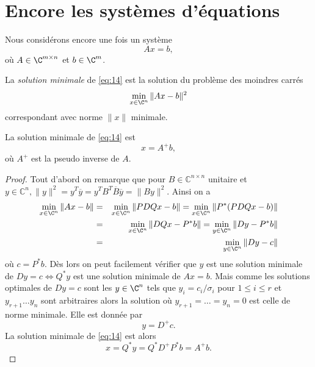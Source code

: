 \section{Encore les systèmes d'équations }
\label{sec:encore-les-systemes}
Nous considérons encore une fois un système 
\begin{equation}
  \label{eq:14}
  Ax = b, 
\end{equation}
où $A \in \C^{m \times n}$ et $b \in \C^m$. 

\begin{definition}
  \label{def:25}
  La \emph{solution minimale} de \eqref{eq:14} est 
  la solution du problème des moindres carrés
  \begin{displaymath}
    \min_{x \in \C^n} \|Ax - b\|^2 
  \end{displaymath}
    correspondant avec norme $\|x\|$ minimale.
\end{definition}



\begin{theorem}
  \label{thr:24}
  La solution minimale de \eqref{eq:14} est 
  \begin{displaymath}
    x = A^+ b,
  \end{displaymath}
où $A^+$ est la pseudo inverse de $A$. 
\end{theorem}

\begin{proof}
Tout d'abord on remarque que pour $B\in \mathbb{C}^{n \times n}$ unitaire et $ y\in \mathbb{C}^n, \|y\|^2=y^T\overline {y}=y^TB^T\overline { B}\overline { y }=\|By\|^2$. Ainsi on a 
  \begin{eqnarray*}
    \min_{x \in \C^n} \|Ax - b\| & = &      \min_{x \in \C^n} \|PDQx - b\| =     \min_{x \in \C^n} \|P^* (PDQx - b)\|        \\
     & = &     \min_{x \in \C^n} \|DQx - P^*b\| =     \min_{y \in \C^n} \|Dy - P^*b \| \\
      & = &       \min_{y \in \C^n} \|Dy - c \|
  \end{eqnarray*}
où $c  = P^*b$. Dès lors on peut facilement vérifier que $y$ est une solution minimale de $Dy=c \Leftrightarrow  Q^*y$ est une solution minimale de $Ax=b$. Mais comme les solutions optimales de $Dy=c$  sont les $y \in \C^n$ tels que $y_i = c_i / \sigma_i $ pour $1 \leq i \leq r$ et $y_{r+1} \dots y_n$ sont arbitraires alors la solution où $y_{r+1} =\dots= y_n=0$ est celle de norme minimale. Elle est donnée par
\begin{displaymath}
  y = D^+ c. 
\end{displaymath}
La solution minimale de \eqref{eq:14} est alors 
\begin{displaymath}
  x = Q^*y = Q^* D^+ P^* b = A^+b. 
\end{displaymath}
\end{proof}

